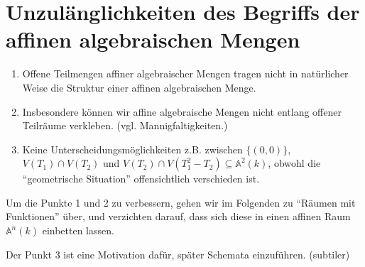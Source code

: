 
\section{Unzulänglichkeiten des Begriffs der affinen algebraischen Mengen}
\label{sec:unzulaenglichkeiten-alg-mengen}
\begin{enumerate}
\item Offene Teilmengen affiner algebraischer Mengen tragen nicht in natürlicher
  Weise die Struktur einer affinen algebraischen Menge.
\item Insbesondere können wir affine algebraische Mengen nicht entlang offener
  Teilräume verkleben. (vgl. Mannigfaltigkeiten.)
\item Keine Unterscheidungsmöglichkeiten z.B. zwischen $\{(0,0)\}$,
  $V(T_{1})\cap V(T_{2})$ und
  $V(T_{2})\cap V(T_{1}^{2}-T_{2})\subseteq\mathbb{A}^{2}(k)$, obwohl
  die ``geometrische Situation'' offensichtlich verschieden ist.
\end{enumerate}
Um die Punkte 1 und 2 zu verbessern, gehen wir im Folgenden zu ``Räumen mit Funktionen'' über, und verzichten darauf,
dass sich diese in einen affinen Raum $\mathbb{A}^{n}(k)$ einbetten
lassen.

Der Punkt 3 ist eine Motivation dafür, später Schemata einzuführen.
(subtiler)

